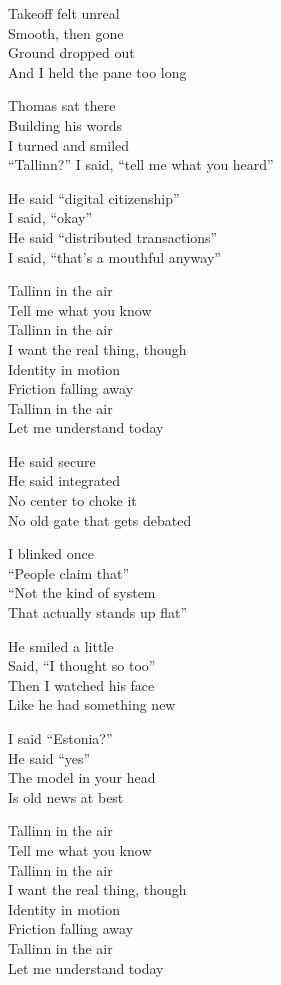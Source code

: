 \begin{lyrics}
Takeoff felt unreal\\
Smooth, then gone\\
Ground dropped out\\
And I held the pane too long

Thomas sat there\\
Building his words\\
I turned and smiled\\
“Tallinn?” I said, “tell me what you heard”

He said “digital citizenship”\\
I said, “okay”\\
He said “distributed transactions”\\
I said, “that’s a mouthful anyway”

Tallinn in the air\\
Tell me what you know\\
Tallinn in the air\\
I want the real thing, though\\
Identity in motion\\
Friction falling away\\
Tallinn in the air\\
Let me understand today

He said secure\\
He said integrated\\
No center to choke it\\
No old gate that gets debated

I blinked once\\
“People claim that”\\
“Not the kind of system\\
That actually stands up flat”

He smiled a little\\
Said, “I thought so too”\\
Then I watched his face\\
Like he had something new

I said “Estonia?”\\
He said “yes”\\
The model in your head\\
Is old news at best

Tallinn in the air\\
Tell me what you know\\
Tallinn in the air\\
I want the real thing, though\\
Identity in motion\\
Friction falling away\\
Tallinn in the air\\
Let me understand today


\end{lyrics}
